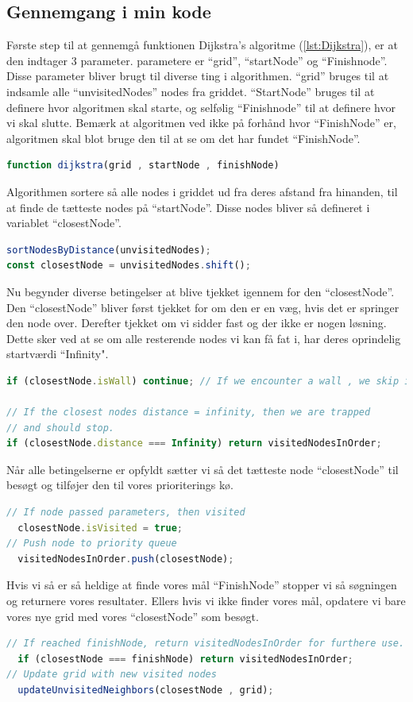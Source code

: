 \documentclass[12pt]{article}
\begin{document}
\subsection{Gennemgang i min kode}
Første step til at gennemgå funktionen Dijkstra’s algoritme (\ref{lst:Dijkstra}), er at den indtager 3 parameter. parametere er “grid”, 
“startNode” og “Finishnode”. Disse parameter bliver brugt til diverse ting i algorithmen. “grid” bruges til at indsamle alle “unvisitedNodes” nodes fra griddet. 
“StartNode” bruges til at definere hvor algoritmen skal starte, og selfølig “Finishnode” til at definere hvor vi skal slutte. Bemærk at algoritmen ved ikke på forhånd hvor “FinishNode” er, algoritmen skal blot bruge den til at se om det har fundet “FinishNode”.   
\begin{lstlisting}[language=JavaScript]
function dijkstra(grid , startNode , finishNode)
\end{lstlisting}
Algorithmen sortere så alle nodes i griddet ud fra deres afstand fra hinanden, til at finde de tætteste nodes på “startNode”. Disse nodes bliver så defineret i variablet “closestNode”.
\begin{lstlisting}[language=JavaScript]
sortNodesByDistance(unvisitedNodes);
const closestNode = unvisitedNodes.shift();
\end{lstlisting}
Nu begynder diverse betingelser at blive tjekket igennem for den “closestNode”. Den “closestNode” bliver først tjekket for om den er en væg, hvis det er springer den node over. Derefter tjekket om vi sidder fast og der ikke er nogen løsning. Dette sker ved at se om alle resterende nodes vi kan få fat i, har deres oprindelig startværdi “Infinity".
\begin{lstlisting}[language=JavaScript]
if (closestNode.isWall) continue; // If we encounter a wall , we skip it.

// If the closest nodes distance = infinity, then we are trapped
// and should stop.
if (closestNode.distance === Infinity) return visitedNodesInOrder; 
\end{lstlisting}
Når alle betingelserne er opfyldt sætter vi så det tætteste node “closestNode” til besøgt og tilføjer den til vores prioriterings kø. 
\begin{lstlisting}[language=JavaScript]
// If node passed parameters, then visited
  closestNode.isVisited = true;
// Push node to priority queue
  visitedNodesInOrder.push(closestNode);
\end{lstlisting}
Hvis vi så er så heldige at finde vores mål “FinishNode” stopper vi så søgningen og returnere vores resultater. Ellers hvis vi ikke finder vores mål, opdatere vi bare vores nye grid med vores “closestNode” som besøgt. 
\begin{lstlisting}[language=JavaScript]
// If reached finishNode, return visitedNodesInOrder for furthere use.
  if (closestNode === finishNode) return visitedNodesInOrder;
// Update grid with new visited nodes
  updateUnvisitedNeighbors(closestNode , grid);
\end{lstlisting}
\end{document}
